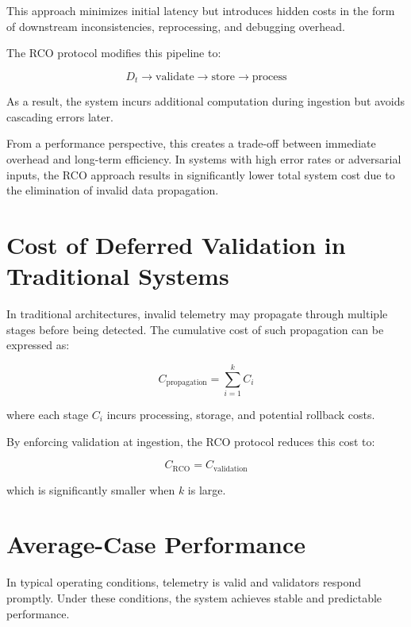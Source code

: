 This approach minimizes initial latency but introduces hidden costs in the form of downstream inconsistencies, reprocessing, and debugging overhead.

The RCO protocol modifies this pipeline to:

\begin{equation}
D_t \rightarrow \text{validate} \rightarrow \text{store} \rightarrow \text{process}
\end{equation}

As a result, the system incurs additional computation during ingestion but avoids cascading errors later.

From a performance perspective, this creates a trade-off between immediate overhead and long-term efficiency. In systems with high error rates or adversarial inputs, the RCO approach results in significantly lower total system cost due to the elimination of invalid data propagation.

\section{Cost of Deferred Validation in Traditional Systems}

In traditional architectures, invalid telemetry may propagate through multiple stages before being detected. The cumulative cost of such propagation can be expressed as:

\begin{equation}
C_{\text{propagation}} = \sum_{i=1}^{k} C_i
\end{equation}

where each stage $C_i$ incurs processing, storage, and potential rollback costs.

By enforcing validation at ingestion, the RCO protocol reduces this cost to:

\begin{equation}
C_{\text{RCO}} = C_{\text{validation}}
\end{equation}

which is significantly smaller when $k$ is large.

\section{Average-Case Performance}

In typical operating conditions, telemetry is valid and validators respond promptly. Under these conditions, the system achieves stable and predictable performance.

